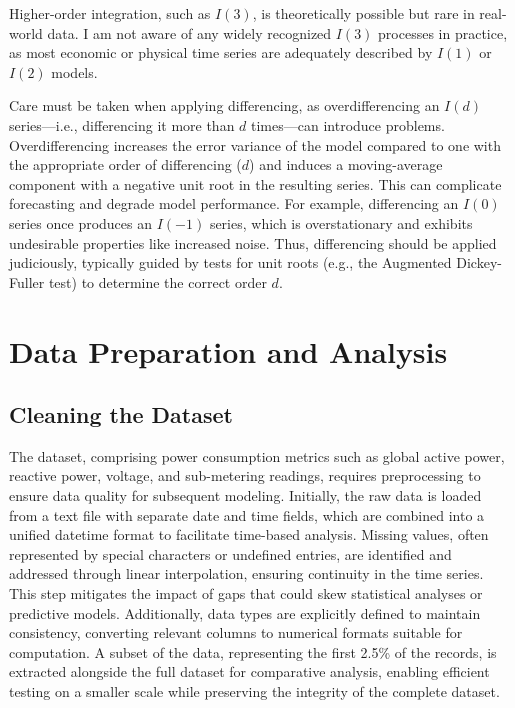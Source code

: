 	Higher-order integration, such as \(I(3)\), is theoretically possible but rare in real-world data. I am not aware of any widely recognized \(I(3)\) processes in practice, as most economic or physical time series are adequately described by \(I(1)\) or \(I(2)\) models.
	
	Care must be taken when applying differencing, as overdifferencing an \(I(d)\) series---i.e., differencing it more than \(d\) times---can introduce problems. Overdifferencing increases the error variance of the model compared to one with the appropriate order of differencing (\(d\)) and induces a moving-average component with a negative unit root in the resulting series. This can complicate forecasting and degrade model performance. For example, differencing an \(I(0)\) series once produces an \(I(-1)\) series, which is overstationary and exhibits undesirable properties like increased noise. Thus, differencing should be applied judiciously, typically guided by tests for unit roots (e.g., the Augmented Dickey-Fuller test) to determine the correct order \(d\).
	
	\section{Data Preparation and Analysis}
	
	\subsection{Cleaning the Dataset}
	The dataset, comprising power consumption metrics such as global active power, reactive power, voltage, and sub-metering readings, requires preprocessing to ensure data quality for subsequent modeling. Initially, the raw data is loaded from a text file with separate date and time fields, which are combined into a unified datetime format to facilitate time-based analysis. Missing values, often represented by special characters or undefined entries, are identified and addressed through linear interpolation, ensuring continuity in the time series. This step mitigates the impact of gaps that could skew statistical analyses or predictive models. Additionally, data types are explicitly defined to maintain consistency, converting relevant columns to numerical formats suitable for computation. A subset of the data, representing the first 2.5\% of the records, is extracted alongside the full dataset for comparative analysis, enabling efficient testing on a smaller scale while preserving the integrity of the complete dataset.
	
